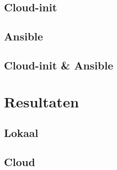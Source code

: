 \subsection{Cloud-init}

\subsection{Ansible}

\subsection{Cloud-init \& Ansible}

\section{Resultaten}

\subsection{Lokaal}

\subsection{Cloud}
